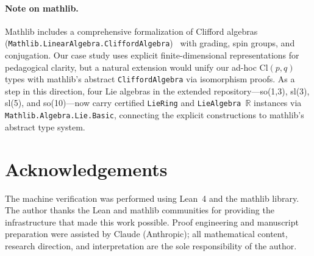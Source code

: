 \documentclass[runningheads]{llncs}
\begin{document}
\paragraph{Note on mathlib.} Mathlib includes a comprehensive formalization of
Clifford algebras (\texttt{Mathlib.LinearAlgebra.CliffordAlgebra})~\cite{wieser2021clifford}
with grading, spin groups, and conjugation. Our case study uses explicit
finite-dimensional representations for pedagogical clarity, but a natural
extension would unify our ad-hoc $\mathrm{Cl}(p,q)$ types with mathlib's
abstract \texttt{CliffordAlgebra} via isomorphism proofs. As a step in this
direction, four Lie algebras in the extended repository---so(1,3), sl(3),
sl(5), and so(10)---now carry certified \texttt{LieRing} and
\texttt{LieAlgebra~$\mathbb{R}$} instances via
\texttt{Mathlib.Algebra.Lie.Basic}, connecting the explicit constructions to
mathlib's abstract type system.

\section*{Acknowledgements}

The machine verification was performed using Lean~4 and the mathlib
library. The author thanks the Lean and mathlib communities for providing
the infrastructure that made this work possible.
Proof engineering and manuscript preparation were assisted by Claude
(Anthropic); all mathematical content, research direction, and
interpretation are the sole responsibility of the author.

\end{document}
